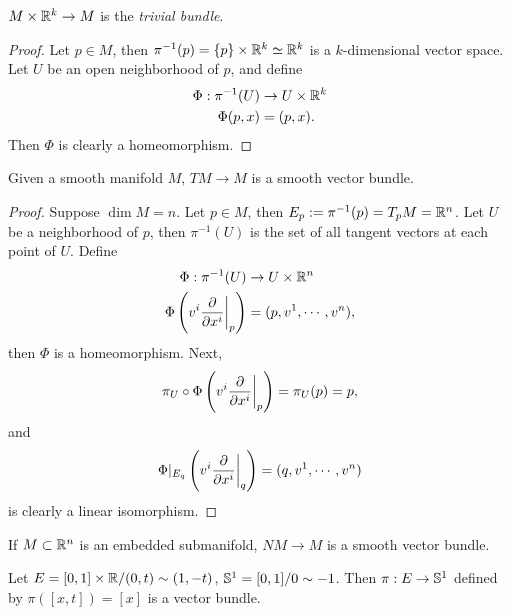\begin{example}
    $M \times \R^k \to M$ is the \textit{trivial bundle}. 
\end{example}
\begin{proof}
    Let $p \in M$, then $\pi^{-1}(p) = \{p\} \times \R^k \simeq \R^k$ is a $k$-dimensional vector space. Let $U$ be an open neighborhood of $p$, and define 
    \begin{align*}
        \Phi: \pi^{-1}(U) &\to U \times \R^k \\
        \Phi(p, x) &= (p, x). 
    \end{align*} Then $\Phi$ is clearly a homeomorphism. 
\end{proof}
\begin{example}
    Given a smooth manifold $M$, $TM \to M$ is a smooth vector bundle. 
\end{example}
\begin{proof}
    Suppose $\dim M = n$. Let $p \in M$, then $E_p := \pi^{-1}(p) = T_p M = \R^n$. Let $U$ be a neighborhood of $p$, then $\pi^{-1}(U)$ is the set of all tangent vectors at each point of $U$. Define
    \begin{align*}
        \Phi: \pi^{-1}(U) &\to U \times \R^n \\
        \Phi\br{v^i \dvBase{x^i}{p}} &= (p, v^1, \cdots, v^n),
    \end{align*}
    then $\Phi$ is a homeomorphism. Next,
    $$\pi_U \circ \Phi\br{v^i \dvBase{x^i}{p}} = \pi_U(p) = p, $$
    and $$\Phi|_{E_q}\br{v^i \dvBase{x^i}{q}} = (q, v^1, \cdots, v^n) $$ is clearly a linear isomorphism. 
\end{proof}
\begin{example}
    If $M \subset \R^n$ is an embedded submanifold, $NM \to M$ is a smooth vector bundle. 
\end{example}
\begin{example}
    Let $E = [0,1] \times \R / (0,t) \sim (1,-t)$, $\S^1 = [0,1] / 0 \sim -1$. Then $\pi:E \to \S^1$ defined by $\pi([x,t]) = [x]$ is a vector bundle. 
\end{example}

